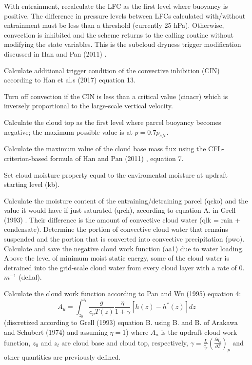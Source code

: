 \begin{DoxyItemize}
\item With entrainment, recalculate the L\+FC as the first level where buoyancy is positive. The difference in pressure levels between L\+F\+Cs calculated with/without entrainment must be less than a threshold (currently 25 h\+Pa). Otherwise, convection is inhibited and the scheme returns to the calling routine without modifying the state variables. This is the subcloud dryness trigger modification discussed in Han and Pan (2011) \cite{han_and_pan_2011}.
\item Calculate additional trigger condition of the convective inhibition (C\+IN) according to Han et al.\textquotesingle{}s (2017) \cite{han_et_al_2017} equation 13.
\item Turn off convection if the C\+IN is less than a critical value (cinacr) which is inversely proportional to the large-\/scale vertical velocity.
\item Calculate the cloud top as the first level where parcel buoyancy becomes negative; the maximum possible value is at $p=0.7p_{sfc}$.
\item Calculate the maximum value of the cloud base mass flux using the C\+F\+L-\/criterion-\/based formula of Han and Pan (2011) \cite{han_and_pan_2011}, equation 7.
\item Set cloud moisture property equal to the enviromental moisture at updraft starting level (kb).
\item Calculate the moisture content of the entraining/detraining parcel (qcko) and the value it would have if just saturated (qrch), according to equation A. in Grell (1993) \cite{grell_1993} . Their difference is the amount of convective cloud water (qlk = rain + condensate). Determine the portion of convective cloud water that remains suspended and the portion that is converted into convective precipitation (pwo). Calculate and save the negative cloud work function (aa1) due to water loading. Above the level of minimum moist static energy, some of the cloud water is detrained into the grid-\/scale cloud water from every cloud layer with a rate of 0. $m^{-1}$ (dellal).
\item Calculate the cloud work function according to Pan and Wu (1995) \cite{pan_and_wu_1995} equation 4\+: \[ A_u=\int_{z_0}^{z_t}\frac{g}{c_pT(z)}\frac{\eta}{1 + \gamma}[h(z)-h^*(z)]dz \] (discretized according to Grell (1993) \cite{grell_1993} equation B. using B. and B. of Arakawa and Schubert (1974) \cite{arakawa_and_schubert_1974} and assuming $\eta=1$) where $A_u$ is the updraft cloud work function, $z_0$ and $z_t$ are cloud base and cloud top, respectively, $\gamma = \frac{L}{c_p}\left(\frac{\partial \overline{q_s}}{\partial T}\right)_p$ and other quantities are previously defined.

\end{DoxyItemize}
